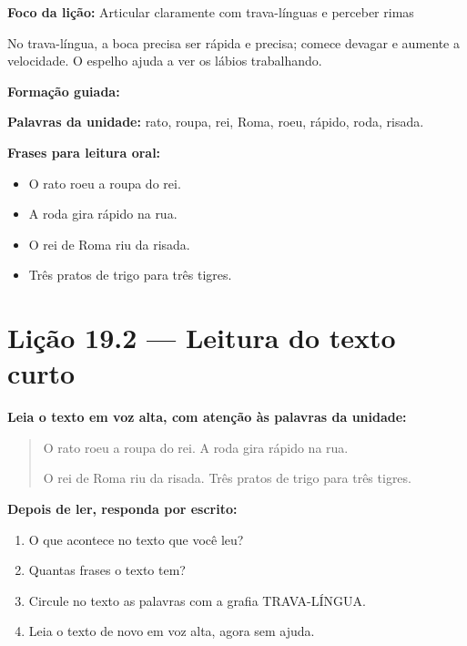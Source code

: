 \textbf{Foco da lição:} Articular claramente com trava-línguas e perceber rimas


\begin{boquinha}
No trava-língua, a boca precisa ser rápida e precisa; comece devagar e aumente a velocidade. O espelho ajuda a ver os lábios trabalhando.
\end{boquinha}

\noindent\textbf{Formação guiada:}

\begin{center}
\end{center}

\noindent\textbf{Palavras da unidade:} rato, roupa, rei, Roma, roeu, rápido, roda, risada.

\noindent\textbf{Frases para leitura oral:}
\begin{itemize}[leftmargin=1.6em]
  \item O rato roeu a roupa do rei.
  \item A roda gira rápido na rua.
  \item O rei de Roma riu da risada.
  \item Três pratos de trigo para três tigres.
\end{itemize}

\section{Lição 19.2 --- Leitura do texto curto}

\noindent\textbf{Leia o texto em voz alta, com atenção às palavras da unidade:}


\begin{quote}
O rato roeu a roupa do rei. A roda gira rápido na rua.

O rei de Roma riu da risada. Três pratos de trigo para três tigres.
\end{quote}

\textbf{Depois de ler, responda por escrito:}
\begin{enumerate}

  \item O que acontece no texto que você leu?
  \begin{center}
  \underline{\hspace{12cm}}
  \end{center}

  \item Quantas frases o texto tem?
  \begin{center}
  \underline{\hspace{12cm}}
  \end{center}

  \item Circule no texto as palavras com a grafia TRAVA-LÍNGUA.

  \item Leia o texto de novo em voz alta, agora sem ajuda.

\end{enumerate}

